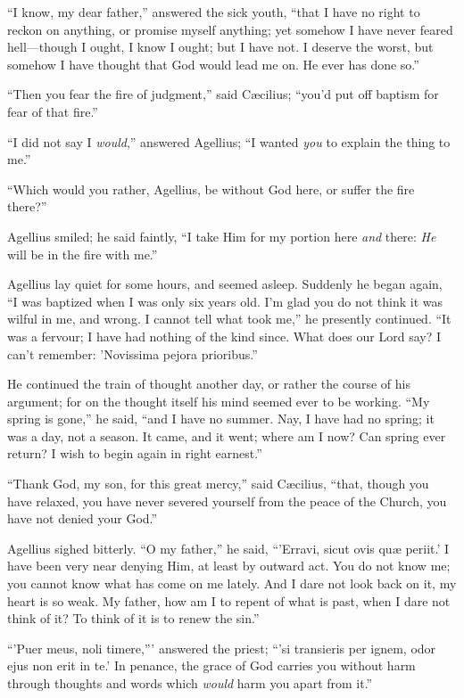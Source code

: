 ``I know, my dear father,'' answered the sick youth,
``that I have no right to reckon on anything, or promise myself
anything; yet somehow I have never feared hell—though I ought, I
know I ought; but I have not. I deserve the worst, but somehow I have
thought that God would lead me on. He ever has done so.''

``Then you fear the fire of judgment,'' said Cæcilius;
``you'd put off baptism for fear of that fire.''

``I did not say I \emph{would},'' answered Agellius;
``I wanted \emph{you} to explain the thing to me.''

``Which would you rather, Agellius, be without God here, or
suffer the fire there?''

Agellius smiled; he said faintly, ``I take Him for my portion
here \emph{and} there: \emph{He} will be in the fire with me.''

Agellius lay quiet for some hours, and seemed asleep. Suddenly he
began again, ``I was baptized when I was only six years old. I'm
glad you do not think it was wilful in me, and wrong. I cannot tell
what took me,'' he presently continued. ``It was a fervour; I
have had nothing of the kind since. What does our Lord say? I can't
remember: 'Novissima pejora prioribus.''

He continued the train of thought another day, or rather the course
of his argument; for on the thought itself his mind seemed ever to be
working. ``My spring is gone,'' he said, ``and I have
no summer. Nay, I have had no spring; it was a day, not a season. It
came, and it went; where am I now? Can spring ever return? I wish to
begin again in right earnest.''

``Thank God, my son, for this great mercy,'' said Cæcilius,
``that, though you have relaxed, you have never severed yourself
from the peace of the Church, you have not denied your God.''

Agellius sighed bitterly. ``O my father,'' he said, ``'Erravi,
sicut ovis quæ periit.' I have been very near denying Him, at least
by outward act. You do not know me; you cannot know what has come on
me lately. And I dare not look back on it, my heart is so weak. My
father, how am I to repent of what is past, when I dare not think of
it? To think of it is to renew the sin.''

``'Puer meus, noli timere,''' answered the priest; ``'si
transieris per ignem, odor ejus non erit in te.' In penance, the grace
of God carries you without harm through thoughts and words which \emph{would}
harm you apart from it.''

